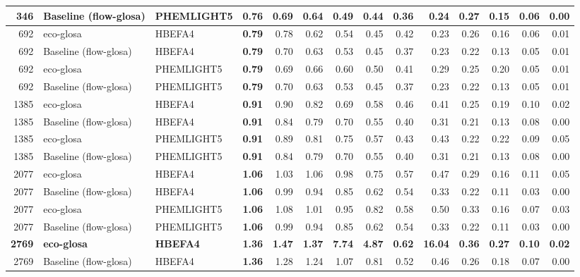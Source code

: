 \begin{table}[htb]
{\begin{tabular}{r l l r *{10}{r}}
    346 & Baseline (\ac{flow-glosa}) & PHEMLIGHT5 & \textbf{0.76} & 0.69 & 0.64 & 0.49 & 0.44 & 0.36 & 0.24 & 0.27 & 0.15 & 0.06 & 0.00\\
    \midrule
    692 & \ac{eco-glosa} & HBEFA4 & \textbf{0.79} & 0.78 & 0.62 & 0.54 & 0.45 & 0.42 & 0.23 & 0.26 & 0.16 & 0.06 & 0.01\\
    692 & Baseline (\ac{flow-glosa}) & HBEFA4 & \textbf{0.79} & 0.70 & 0.63 & 0.53 & 0.45 & 0.37 & 0.23 & 0.22 & 0.13 & 0.05 & 0.01\\
    692 & \ac{eco-glosa} & PHEMLIGHT5 & \textbf{0.79} & 0.69 & 0.66 & 0.60 & 0.50 & 0.41 & 0.29 & 0.25 & 0.20 & 0.05 & 0.01\\
    692 & Baseline (\ac{flow-glosa}) & PHEMLIGHT5 & \textbf{0.79} & 0.70 & 0.63 & 0.53 & 0.45 & 0.37 & 0.23 & 0.22 & 0.13 & 0.05 & 0.01\\
    \midrule
    1385 & \ac{eco-glosa} & HBEFA4 & \textbf{0.91} & 0.90 & 0.82 & 0.69 & 0.58 & 0.46 & 0.41 & 0.25 & 0.19 & 0.10 & 0.02\\
    1385 & Baseline (\ac{flow-glosa}) & HBEFA4 & \textbf{0.91} & 0.84 & 0.79 & 0.70 & 0.55 & 0.40 & 0.31 & 0.21 & 0.13 & 0.08 & 0.00\\
    1385 & \ac{eco-glosa} & PHEMLIGHT5 & \textbf{0.91} & 0.89 & 0.81 & 0.75 & 0.57 & 0.43 & 0.43 & 0.22 & 0.22 & 0.09 & 0.05\\
    1385 & Baseline (\ac{flow-glosa}) & PHEMLIGHT5 & \textbf{0.91} & 0.84 & 0.79 & 0.70 & 0.55 & 0.40 & 0.31 & 0.21 & 0.13 & 0.08 & 0.00\\
    \midrule
    2077 & \ac{eco-glosa} & HBEFA4 & \textbf{1.06} & 1.03 & 1.06 & 0.98 & 0.75 & 0.57 & 0.47 & 0.29 & 0.16 & 0.11 & 0.05\\
    2077 & Baseline (\ac{flow-glosa}) & HBEFA4 & \textbf{1.06} & 0.99 & 0.94 & 0.85 & 0.62 & 0.54 & 0.33 & 0.22 & 0.11 & 0.03 & 0.00\\
    2077 & \ac{eco-glosa} & PHEMLIGHT5 & \textbf{1.06} & 1.08 & 1.01 & 0.95 & 0.82 & 0.58 & 0.50 & 0.33 & 0.16 & 0.07 & 0.03\\
    2077 & Baseline (\ac{flow-glosa}) & PHEMLIGHT5 & \textbf{1.06} & 0.99 & 0.94 & 0.85 & 0.62 & 0.54 & 0.33 & 0.22 & 0.11 & 0.03 & 0.00\\
    \midrule
    \textbf{2769} & \textbf{\ac{eco-glosa}} & \textbf{HBEFA4} & \textbf{1.36} & \textbf{1.47} & \textbf{1.37} & \textbf{7.74} & \textbf{4.87} & \textbf{0.62} & \textbf{16.04} & \textbf{0.36} & \textbf{0.27} & \textbf{0.10} & \textbf{0.02}\\
    2769 & Baseline (\ac{flow-glosa}) & HBEFA4 & \textbf{1.36} & 1.28 & 1.24 & 1.07 & 0.81 & 0.52 & 0.46 & 0.26 & 0.18 & 0.07 & 0.00\\

\end{tabular}}
\end{table}
